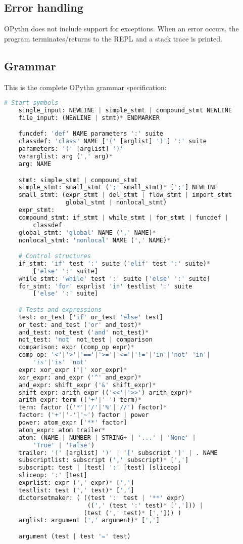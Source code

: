 \documentclass[11pt, twoside]{article}
\begin{document}
    \subsection{Error handling}
    OPythn does not include support for exceptions. When an error occurs, the program terminates/returns to the REPL and a stack trace is printed.

    \subsection{Grammar}
    This is the complete OPythn grammar specification:
    \begin{lstlisting}[language=python]
    # Start symbols
    single_input: NEWLINE | simple_stmt | compound_stmt NEWLINE
    file_input: (NEWLINE | stmt)* ENDMARKER

    funcdef: 'def' NAME parameters ':' suite
    classdef: 'class' NAME ['(' [arglist] ')'] ':' suite
    parameters: '(' [arglist] ')'
    vararglist: arg (',' arg)*
    arg: NAME

    stmt: simple_stmt | compound_stmt
    simple_stmt: small_stmt (';' small_stmt)* [';'] NEWLINE
    small_stmt: (expr_stmt | del_stmt | flow_stmt | import_stmt
                 global_stmt | nonlocal_stmt)
    expr_stmt:
    compound_stmt: if_stmt | while_stmt | for_stmt | funcdef |
        classdef
    global_stmt: 'global' NAME (',' NAME)*
    nonlocal_stmt: 'nonlocal' NAME (',' NAME)*

    # Control structures
    if_stmt: 'if' test ':' suite ('elif' test ':' suite)*
        ['else' ':' suite]
    while_stmt: 'while' test ':' suite ['else' ':' suite]
    for_stmt: 'for' exprlist 'in' testlist ':' suite
        ['else' ':' suite]

    # Tests and expressions
    test: or_test ['if' or_test 'else' test]
    or_test: and_test ('or' and_test)*
    and_test: not_test ('and' not_test)*
    not_test: 'not' not_test | comparison
    comparison: expr (comp_op expr)*
    comp_op: '<'|'>'|'=='|'>='|'<='|'!='|'in'|'not' 'in'|
        'is'|'is' 'not'
    expr: xor_expr ('|' xor_expr)*
    xor_expr: and_expr ('^' and_expr)*
    and_expr: shift_expr ('&' shift_expr)*
    shift_expr: arith_expr (('<<'|'>>') arith_expr)*
    arith_expr: term (('+'|'-') term)*
    term: factor (('*'|'/'|'%'|'//') factor)*
    factor: ('+'|'-'|'~') factor | power
    power: atom_expr ['**' factor]
    atom_expr: atom trailer*
    atom: (NAME | NUMBER | STRING+ | '...' | 'None' |
        'True' | 'False')
    trailer: '(' [arglist] ')' | '[' subscript ']' | . NAME
    subscriptlist: subscript (',' subscript)* [',']
    subscript: test | [test] ':' [test] [sliceop]
    sliceop: ':' [test]
    exprlist: expr (',' expr)* [',']
    testlist: test (',' test)* [',']
    dictorsetmaker: ( ((test ':' test | '**' expr)
                       ((',' (test ':' test)* [','])) |
                      (test (',' test)* [','])) )
    arglist: argument (',' argument)* [',']

    argument (test | test '=' test)
    \end{lstlisting}
\end{document}
